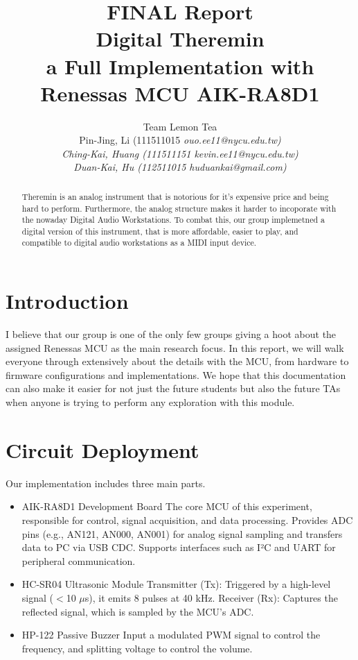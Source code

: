 \documentclass[12pt]{article}
\title{\vspace{-0.2em} \large FINAL Report\\
\Huge Digital Theremin \\
\Large a Full Implementation with Renessas MCU AIK-RA8D1
}
\author{
  Team Lemon Tea \\
  \small
  Pin-Jing, Li (111511015 \it{ouo.ee11@nycu.edu.tw})\\ 
  \small
Ching-Kai, Huang (111511151 \it{kevin.ee11@nycu.edu.tw})\\ 
  \small
Duan-Kai, Hu (112511015 \it{huduankai@gmail.com})}
\begin{document}
\maketitle

\begin{abstract}
  Theremin is an analog instrument that is notorious for it's expensive price and being hard to perform. 
  Furthermore, the analog structure makes it harder to incoporate with the nowaday Digital Audio Workstations.
  To combat this, our group implemetned a digital version of this instrument, that is more affordable, easier to play, and compatible to digital audio workstations as a MIDI input device. 
\end{abstract}
\section{Introduction}
I believe that our group is one of the only few groups giving a hoot about the assigned Renessas MCU as the main research focus. 
In this report, we will walk everyone through extensively about the details with the MCU, from hardware to firmware configurations and implementations. 
We hope that this documentation can also make it easier for not just the future students but also the future TAs when anyone is trying to 
perform any exploration with this module.


\section{Circuit Deployment}
Our implementation includes three main parts.

\begin{itemize}
\item[1] AIK-RA8D1 Development Board
The core MCU of this experiment, responsible for control, signal acquisition, and data processing.
Provides ADC pins (e.g., AN121, AN000, AN001) for analog signal sampling and transfers data to PC via USB CDC.
Supports interfaces such as I²C and UART for peripheral communication.

\item[2]HC-SR04 Ultrasonic Module
Transmitter (Tx): Triggered by a high-level signal ($<$10 $\mu$s), it emits 8 pulses at 40 kHz.
Receiver (Rx): Captures the reflected signal, which is sampled by the MCU’s ADC.

\item[3]HP-122 Passive Buzzer
Input a modulated PWM signal to control the frequency, and splitting voltage to control the volume.

\end{itemize}
\end{document}
